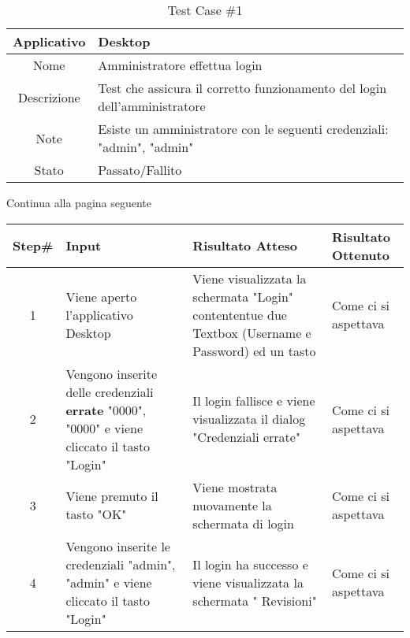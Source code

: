 
\setcounter{table}{0}
\begin{table}[H]
    \centering
    \footnotesize
    \caption{Test Case \#1}
    \begin{tabularx}{\textwidth}{|c|X|}
        \hline
        Applicativo & Desktop\\
        \hline
        Nome & Amministratore effettua login  \\
        \hline
        Descrizione & Test che assicura il corretto funzionamento del login dell'amministratore\\
        \hline
        Note & Esiste un amministratore con le seguenti credenziali: "admin", "admin" \\
        \hline
        Stato & Passato/Fallito\\
        \hline

    \end{tabularx}
    Continua alla pagina seguente
    \setlength{\tabcolsep}{8pt}
    \renewcommand{\arraystretch}{1.5}
\end{table}
\begin{table}[H]
    \footnotesize
    \begin{tabularx}{\textwidth}{|c|X|X|X|}
        \hline
        Step\# & Input & Risultato Atteso & Risultato Ottenuto \\
        \hline
         1 & Viene aperto l'applicativo Desktop  
         & Viene visualizzata la schermata "Login" contententue due Textbox (Username e Password) 
         ed un tasto
         &Come ci si aspettava\\
          \hline
        2 & Vengono inserite delle credenziali \textbf{errate} "0000", "0000" e viene cliccato 
        il tasto "Login" 
        & Il login fallisce e viene visualizzata il dialog "Credenziali errate"
        & Come ci si aspettava\\
         \hline
         3 & Viene premuto il tasto "OK"
        & Viene mostrata nuovamente la schermata di login
        & Come ci si aspettava\\
        4 & Vengono inserite le credenziali "admin", "admin" e viene cliccato 
        il tasto "Login" 
        & Il login ha successo e viene visualizzata la schermata "
        Revisioni" 
        & Come ci si aspettava\\
         \hline
                 
    \end{tabularx}
\end{table}
    
       
